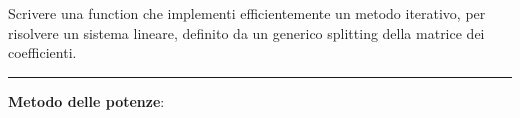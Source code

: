 Scrivere una function che implementi efficientemente un metodo iterativo, per risolvere un sistema lineare,
definito da un generico splitting della matrice dei coefficienti.

\hspace*{\fill}
\par\noindent\rule{\textwidth}{0.4pt}
\hspace*{\fill}

\textbf{Metodo delle potenze}:

